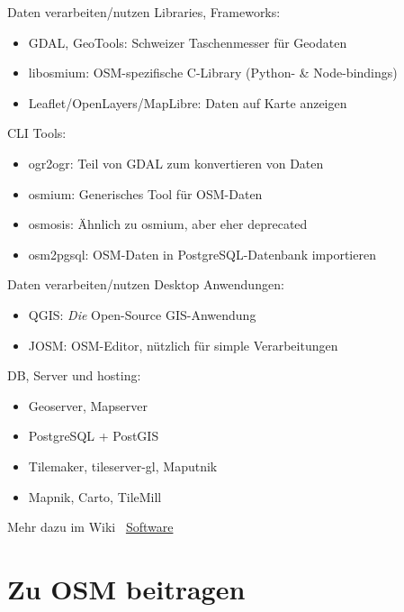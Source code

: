 \documentclass{beamer}
\begin{document}
			\begin{frame}{Daten verarbeiten/nutzen}
				Libraries, Frameworks:
				\begin{itemize}
					\item GDAL, GeoTools: Schweizer Taschenmesser für Geodaten
					\item libosmium: OSM-spezifische C-Library (Python- \& Node-bindings)
					\item Leaflet/OpenLayers/MapLibre: Daten auf Karte anzeigen
				\end{itemize}
				\pause
				CLI Tools:
				\begin{itemize}
					\item ogr2ogr: Teil von GDAL zum konvertieren von Daten
					\item osmium: Generisches Tool für OSM-Daten
					\item osmosis: Ähnlich zu osmium, aber eher deprecated
					\item osm2pgsql: OSM-Daten in PostgreSQL-Datenbank importieren
				\end{itemize}
			\end{frame}
		
			\begin{frame}{Daten verarbeiten/nutzen}
				Desktop Anwendungen:
				\begin{itemize}
					\item QGIS: \textit{Die} Open-Source GIS-Anwendung
					\item JOSM: OSM-Editor, nützlich für simple Verarbeitungen
				\end{itemize}
				\pause
				DB, Server und hosting:
				\begin{itemize}
					\item Geoserver, Mapserver
					\item PostgreSQL + PostGIS
					\item Tilemaker, tileserver-gl, Maputnik
					\item Mapnik, Carto, TileMill
				\end{itemize}
				\pause
				\vspace{0.25cm}
				Mehr dazu im Wiki \textrightarrow\ \href{https://wiki.openstreetmap.org/wiki/Software}{Software}
			\end{frame}

	\section{Zu OSM beitragen}
	
		\begin{frame}
			\tableofcontents[currentsection]
		\end{frame}
		
\end{document}
